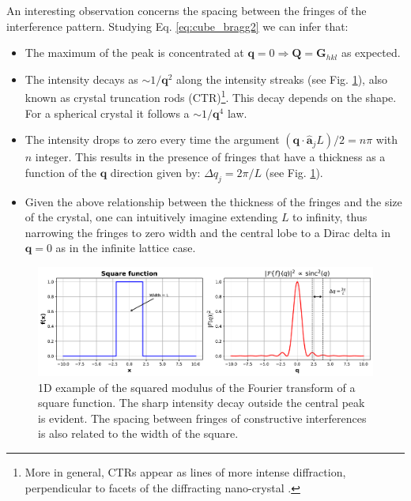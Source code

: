 An interesting observation concerns the spacing between the fringes of the interference pattern. Studying Eq. \ref{eq:cube_bragg2}
we can infer that:  

\begin{itemize}
    \item The maximum of the peak is concentrated at $\mathbf q = 0  \Rightarrow \mathbf Q = \mathbf{G}_{hkl}$ as expected. 
    \item The intensity decays as $ \sim 1/\mathbf{q}^2$ along the intensity streaks (see Fig. \ref{fig:square_ft}), also known as crystal truncation 
    rods (CTR)\footnote[1]{More in general, CTRs appear as lines of more intense diffraction, perpendicular 
    to facets of the diffracting nano-crystal \cite{Robinson1986CTR}.}. This decay depends on the shape. For a spherical crystal it follows a $ \sim 1/\mathbf{q}^4$ law.
    \item The 
    intensity drops to zero every time the argument $(\mathbf{q} \cdot \mathbf{\hat{a}}_j L) /2 = n\pi$ with $n$ integer. 
    This results in the presence of fringes that have a thickness as a function of the $\mathbf q$ direction given by:
    $\Delta q_j = 2\pi/L$ (see Fig. \ref{fig:square_ft}). 
    \item Given the above relationship between the thickness of the fringes and the size of the crystal, one can intuitively
    imagine extending $L$ to infinity, thus narrowing the fringes to zero width and the central lobe to a Dirac delta in $\mathbf{q} = 0$ 
    as in the infinite lattice case. 
\end{itemize}

\begin{figure}[H]
    \centering
    \includegraphics[width=\textwidth]{figures/Intro/square.pdf}
    \caption{1D example of the squared modulus of the Fourier transform of a square function. The sharp intensity decay 
     outside the central peak is evident. The spacing between fringes of constructive interferences is also related 
     to the width of the square.}
    \label{fig:square_ft}
\end{figure}

